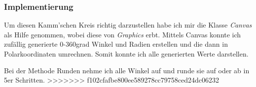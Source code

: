 \subsubsection{Implementierung}
Um diesen Kamm'schen Kreis richtig darzustellen habe ich mir die Klasse \textit{Canvas} als Hilfe genommen, wobei diese von \textit{Graphics} erbt.
Mittels Canvas konnte ich zufällig generierte 0-360grad Winkel und Radien erstellen und die dann in Polarkoordinaten umrechnen.
Somit konnte ich alle generierten Werte darstellen. 



Bei der Methode Runden nehme ich alle Winkel auf und runde sie auf oder ab in 5er Schritten.
>>>>>>> f102cfafbe800ee589278cc79758ced24dc06232



\clearpage %